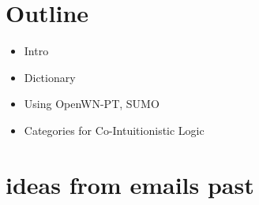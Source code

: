 










\section{Outline} 
\begin{itemize}
\item Intro
\item Dictionary
\item Using OpenWN-PT, SUMO
\item Categories for Co-Intuitionistic Logic
\end{itemize}

\section{ideas from emails past}

